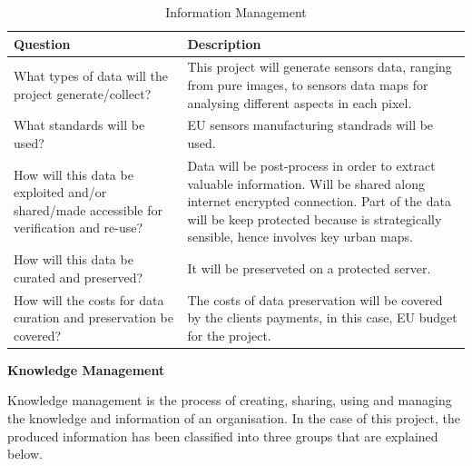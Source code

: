 \begin{table}[H]
	\centering
	\begin{tabular}{p{7cm} p{7cm}}
		
		\toprule[2pt]
		
		\textbf{Question} &  \textbf{Description}\\
		
		\midrule [1.5pt]
		
		What types of data will the project generate/collect?  & This project will generate sensors data, ranging from pure images, to sensors data maps for analysing different aspects in each pixel.\vspace{0.2cm}\\
		
		\midrule
		
		What standards will be used?  & EU sensors manufacturing standrads will be used.\vspace{0.2cm}\\
		
		\midrule
		
		How will this data be exploited and/or shared/made accessible for verification and re-use? & Data will be post-process in order to extract valuable information. Will be shared along internet encrypted connection. Part of the data will be keep protected because is strategically sensible, hence involves key urban maps.\vspace{0.2cm}\\
		
		\midrule
		
		How will this data be curated and preserved? & It will be preserveted on a protected server.\vspace{0.2cm}\\
		
		\midrule
		
		How will the costs for data curation and preservation be covered? & The costs of data preservation will be covered by the clients payments, in this case, EU budget for the project.\vspace{0.2cm}\\	
		
		\bottomrule[2pt]
		
	\end{tabular}
	\caption{Information Management}
\end{table}

\textbf{Knowledge Management}

Knowledge management is the process of creating, sharing, using and managing the knowledge and information of an organisation. In the case of this project, the produced information has been classified into three groups that are explained below.

